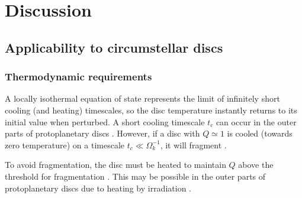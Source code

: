
\section{Discussion}\label{discussions} 

{\bf
  \subsection{Applicability to circumstellar discs}
  

  \subsubsection{Thermodynamic requirements}
  


  A locally isothermal equation of state represents the limit
  of infinitely short cooling (and heating) timescales, so the
  disc temperature instantly returns to its initial value when
  perturbed.  A short cooling timescale $t_c$ can occur in the outer
  parts of protoplanetary discs 
  \citep{rafikov05,clarke09,rice09,cossins10}.  %
  However, if a disc with 
  $Q\simeq 1$ is cooled (towards zero temperature) on a timescale
  $t_c\ll\Omega_k^{-1}$, it will fragment
  \citep{gammie01,paarkedooper12}. 

  To avoid fragmentation, the disc must be heated to
  maintain $Q$ above the threshold for fragmentation \citep[about
  $Q\lesssim 1.4$ for isothermal discs][]{durisen07}. This may be
  possible in the outer parts of protoplanetary discs due to heating
  by irradiation \citep{rafikov07,rice11}. 

}
